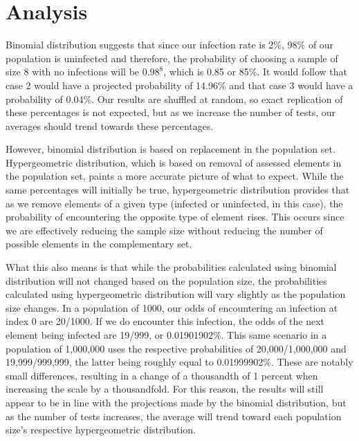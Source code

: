 \documentclass[letterpaper, 10pt]{article}
\begin{document}
\vspace{4.0em}

\section{Analysis}

\hspace{1.0em}Binomial distribution suggests that since our infection rate is 2\%, 98\% of our population is uninfected and therefore, the probability of choosing a sample of size 8 with no infections will be $0.98^8$, which is 0.85 or 85\%. It would follow that case 2 would have a projected probability of 14.96\% and that case 3 would have a probability of 0.04\%. Our results are shuffled at random, so exact replication of these percentages is not expected, but as we increase the number of tests, our averages should trend towards these percentages.

\hspace{1.0em}However, binomial distribution is based on replacement in the population set. Hypergeometric distribution, which is based on removal of assessed elements in the population set, paints a more accurate picture of what to expect. While the same percentages will initially be true, hypergeometric distribution provides that as we remove elements of a given type (infected or uninfected, in this case), the probability of encountering the opposite type of element rises. This occurs since we are effectively reducing the sample size without reducing the number of possible elements in the complementary set.

\hspace{1.0em}What this also means is that while the probabilities calculated using binomial distribution will not changed based on the population size, the probabilities calculated using hypergeometric distribution will vary slightly as the population size changes. In a population of 1000, our odds of encountering an infection at index 0 are 20/1000. If we do encounter this infection, the odds of the next element being infected are 19/999, or 0.01901902\%. This same scenario in a population of 1,000,000 uses the respective probabilities of 20,000/1,000,000 and 19,999/999,999, the latter being roughly equal to 0.01999902\%. These are notably small differences, resulting in a change of a thousandth of 1 percent when increasing the scale by a thousandfold. For this reason, the results will still appear to be in line with the projections made by the binomial distribution, but as the number of tests increases, the average will trend toward each population size's respective hypergeometric distribution.
\end{document}
